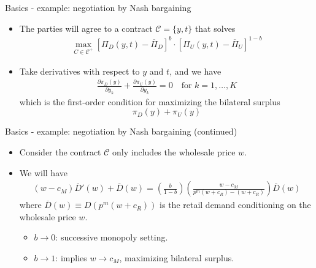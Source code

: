 \documentclass[aspectratio=169]{beamer}  %
\begin{document}
\begin{frame}{Basics - example: negotiation by Nash bargaining}
    \begin{itemize}
        \item The parties will agree to a contract $\mathcal{C} = \{y, t\}$ that solves 
        \begin{align}
            \max_{C \in \mathcal{C}^+} \left[ \Pi_D(y,t) - \overline{\Pi}_D \right]^b \cdot \left[ \Pi_U(y,t) - \overline{\Pi}_U \right]^{1-b}
        \end{align}
        \item Take derivatives with respect to $y$ and $t$, and we have
        \begin{align}
            \frac{\partial \pi_D(y)}{\partial y_k} + \frac{\partial \pi_U(y)}{\partial y_k} = 0 \quad \text{for } k = 1, \ldots, K
        \end{align}
        which is the first-order condition for maximizing the bilateral surplus $$\pi_D(y) + \pi_U(y)$$ \vspace{.2cm}
    \end{itemize}
\end{frame}



\begin{frame}{Basics - example: negotiation by Nash bargaining (continued)}
    \begin{itemize}
        \item Consider the contract $\mathcal{C}$ only includes the wholesale price $w$. \vspace{.2cm}
        \item We will have
        \begin{align}
            (w - c_M) \overline{D}'(w) + \overline{D}(w) = ( \frac{b}{1 - b} ) (\frac{w-c_M}{p^m ( w + c_R) - (w + c_R)}) \overline{D}(w)
        \end{align}
        where $\overline{D}(w) \equiv D(p^m(w+c_R))$ is the retail demand conditioning on the wholesale price $w$. \vspace{.2cm}
        \begin{itemize}
            \item $b\rightarrow0$: successive monopoly setting. \vspace{.2cm}
            \item $b\rightarrow1$: implies $w\rightarrow c_M$, maximizing bilateral surplus. \vspace{.2cm}
        \end{itemize}
    \end{itemize}

\end{frame}
\end{document}
